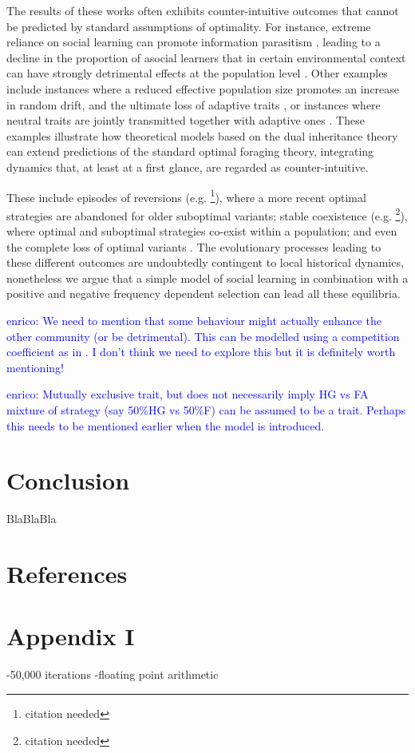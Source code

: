 \documentclass[preprint,authoryear]{elsarticle}
\newcommand{\memo}[2]{\textcolor{#1}{#2}}
\newcommand{\enrico}[1]{\memo{blue}{enrico: #1\\}}
\begin{document}
The results of these works often exhibits counter-intuitive outcomes that cannot be predicted by standard assumptions of optimality. For instance, extreme reliance on social learning can promote information parasitism \citep{giraldeau2002}, leading to a decline in the proportion of asocial learners that in certain environmental context can have strongly detrimental effects at the population level \citep{whitehead2009}. Other examples include instances where a reduced effective population size promotes an increase in random drift, and the ultimate loss of adaptive traits \citep{henrich2004}, or instances where neutral traits are jointly transmitted together with adaptive ones \citep{ackland2007}. These examples illustrate how theoretical models based on the dual inheritance theory can extend predictions of the standard optimal foraging theory, integrating dynamics that, at least at a first glance, are regarded as counter-intuitive. 

These include episodes of reversions (e.g. \footnote{citation needed}), where a more recent optimal strategies are abandoned for older suboptimal variants; stable coexistence (e.g. \footnote{citation needed}), where optimal and suboptimal strategies co-exist within a population; and even the complete loss of optimal variants \citep[e.g.][]{henrich2004}. The evolutionary processes leading to these different outcomes are undoubtedly contingent to local historical dynamics, nonetheless we argue that a simple model of social learning in combination with a positive and negative frequency dependent selection can lead all these equilibria.


\enrico{We need to mention that some behaviour might actually enhance the other community (or be detrimental). This can be modelled using a competition coefficient as in \citep{jang2013}. I don't think we need to explore this but it is definitely worth mentioning!}

\enrico{Mutually exclusive trait, but does not necessarily imply HG vs FA mixture of strategy (say 50\%HG vs 50\%F) can be assumed to be a trait. Perhaps this needs to be mentioned earlier when the model is introduced.}

\section{Conclusion}

BlaBlaBla

\section{References}




\section{Appendix I}

-50,000 iterations
-floating point arithmetic
\end{document}
